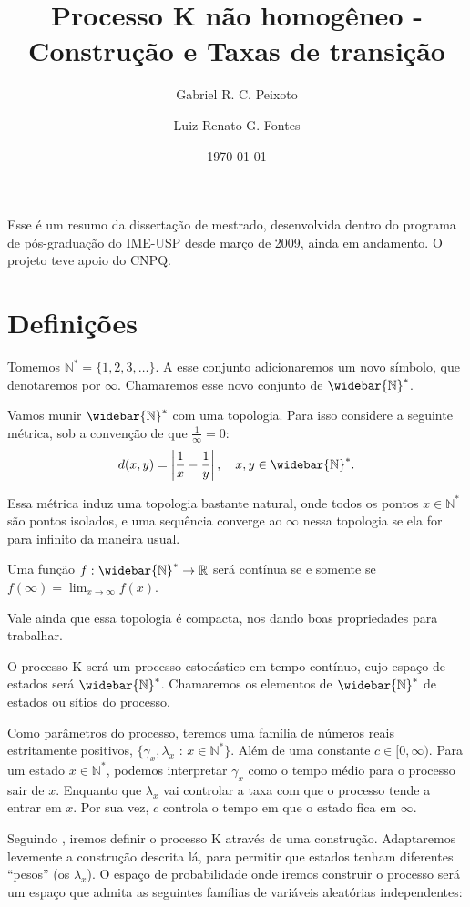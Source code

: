 \documentclass[11pt,twoside,a4paper]{article}
\title{Processo K não homogêneo - Construção e Taxas de transição}
\author{
  Gabriel R. C. Peixoto
  \and
  Luiz Renato G. Fontes
}
\date{\today}
\newcommand{\Nz}{{\mathbb{N^*}}}
\newcommand{\Nzb}{{\mathbb{\widebar{N}^*}}}
\newcommand{\R}{{\mathbb{R}}}
\begin{document}
\maketitle

Esse é um resumo da dissertação de mestrado, desenvolvida dentro do
programa de pós-graduação do IME-USP desde março de 2009, ainda em
andamento. O projeto teve apoio do CNPQ.

\section{Definições}
\label{sec:definicoes}

Tomemos $\Nz = \{ 1, 2, 3, \ldots\}$. A esse conjunto adicionaremos um
novo símbolo, que denotaremos por $\infty$. Chamaremos esse novo
conjunto de $\Nzb$.


Vamos munir $\Nzb$ com uma topologia. Para isso considere a
seguinte métrica, sob a convenção de que $\frac{1}{\infty} = 0$:
\begin{equation}
  \label{eq:metrica}
  d(x, y) = \left\lvert \frac{1}{x} - \frac{1}{y} \right\rvert,
  \quad x, y \in \Nzb.
\end{equation}


Essa métrica induz uma topologia bastante natural, onde todos os
pontos $x \in \Nz$ são pontos isolados, e uma sequência converge ao
$\infty$ nessa topologia se ela for para infinito da maneira
usual.

Uma função $f: \Nzb \to \R$ será contínua se e somente se
$f(\infty) = \lim_{x \to \infty} f(x)$.

Vale ainda que essa topologia é compacta, nos dando boas propriedades
para trabalhar.

O processo K será um processo estocástico em tempo contínuo, cujo
espaço de estados será $\Nzb$. Chamaremos os elementos de $\Nzb$ de
estados ou sítios do processo.

Como parâmetros do processo, teremos uma família de números reais
estritamente positivos, $\{ \gamma_x, \lambda_x$ : $x \in \Nz\}$. Além
de uma constante $c \in [0, \infty)$.  Para um estado $x \in \Nz$,
podemos interpretar $\gamma_x$ como o tempo médio para o processo sair
de $x$. Enquanto que $\lambda_x$ vai controlar a taxa com que o
processo tende a entrar em $x$. Por sua vez, $c$ controla o tempo em
que o estado fica em $\infty$.

Seguindo \cite{fontes:08}, iremos definir o processo K através de uma
construção. Adaptaremos levemente a construção descrita lá, para
permitir que estados tenham diferentes ``pesos'' (os $\lambda_x$).  O
espaço de probabilidade onde iremos construir o processo será um
espaço que admita as seguintes famílias de variáveis aleatórias
independentes:
\end{document}
